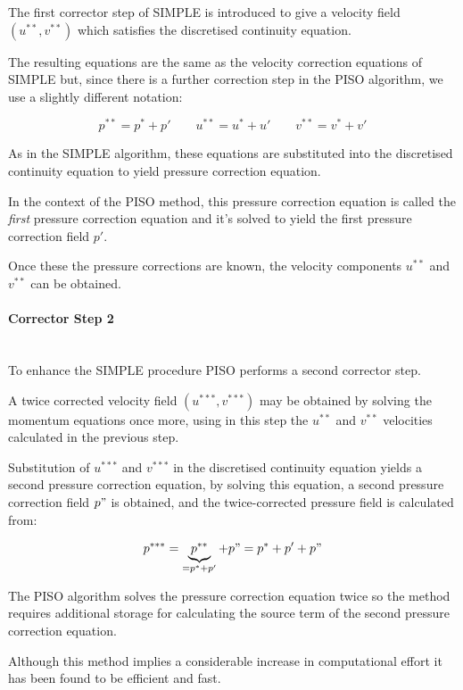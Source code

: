 \documentclass[a4paper, 15pt]{article}
\begin{document}
The first corrector step of SIMPLE is introduced to give a velocity field $(u^{**}, v^{**})$ which satisfies
the discretised continuity equation. \newline 

The resulting equations are the same as the velocity correction equations of SIMPLE but, since
there is a further correction step in the PISO algorithm, we use a slightly different notation:

\[p^{**} = p^* + p' \qquad u^{**} = u^* + u' \qquad v^{**} = v^* + v'\]

As
in the SIMPLE algorithm, these equations are substituted into the discretised continuity
equation to yield pressure correction equation.

In
the context of the PISO method, this pressure correction equation is called the \textit{first} pressure
correction equation and it's solved to yield the first pressure correction field $p'$. 

Once these the pressure corrections are
known, the velocity components $u^{**}$ and $v^{**}$ can be obtained.

\paragraph*{Corrector Step 2} \mbox{} \\
To
enhance the SIMPLE procedure PISO performs a second corrector step. \newline 

A
twice corrected velocity field $(u^{***}, v^{***})$ may be obtained by solving the momentum
equations once more, using in this step the $u^{**}$ and $v^{**}$ velocities calculated in the
previous step. \newline 

Substitution of $u^{***}$ and $v^{***}$ in the discretised continuity equation yields a second pressure
correction equation, by solving this equation, a second pressure correction field $p"$ is
obtained, and the twice-corrected pressure field is calculated from:

\[p^{***} = \underbrace{p^{**}}_{= p^* + p'} + p" = p^* + p' + p"\]

The
PISO algorithm solves the pressure correction equation
twice so the method requires additional storage for
calculating the source term of the second pressure
correction equation. \newline 

Although
this method implies a considerable increase in
computational effort it has been found to be efficient and
fast. 
\end{document}
